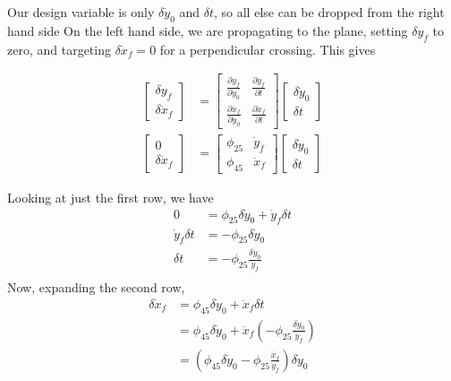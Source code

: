 \documentclass{article}
\begin{document}
Our design variable is only $\delta \dot{y}_0$ and $\delta t$, so all else can be dropped from the right hand side  On the left hand side, we are propagating to the plane, setting $\delta y_f$ to zero, and targeting $\delta \dot{x}_f=0$ for a perpendicular crossing. This gives 

\begin{align*}
    \begin{bmatrix}\delta y_f\\\delta \dot{x}_f\end{bmatrix}&=
    \begin{bmatrix}
    \frac{\partial y_f}{\partial \dot{y}_0}&\frac{\partial y_f}{\partial t}\\\frac{\partial \dot{x}_f}{\partial \dot{y}_0}&\frac{\partial \dot{x}_f}{\partial t}
    \end{bmatrix}
    \begin{bmatrix}\delta \dot{y}_0\\\delta t\end{bmatrix}\\
    \begin{bmatrix}0\\\delta \dot{x}_f\end{bmatrix}&=
    \begin{bmatrix}
    \phi_{25}&\dot{y}_f\\\phi_{45}&\ddot{x}_f
    \end{bmatrix}
    \begin{bmatrix}\delta \dot{y}_0\\\delta t\end{bmatrix}
\end{align*}

Looking at just the first row, we have
\begin{align*}
    0&=\phi_{25} \delta \dot{y}_0+\dot{y}_f\delta t\\
    \dot{y}_f\delta t&=-\phi_{25} \delta \dot{y}_0\\
    \delta t&=-\phi_{25} \frac{\delta\dot{y}_0}{\dot{y}_f}\\
\end{align*}
Now, expanding the second row,
\begin{align*}
    \delta \dot{x}_f &= \phi_{45}\delta\dot{y}_0+\ddot{x}_f\delta t\\
    &=\phi_{45}\delta\dot{y}_0+\ddot{x}_f\left(-\phi_{25} \frac{\delta\dot{y}_0}{\dot{y}_f}\right)\\
    &=\left(\phi_{45}\delta\dot{y}_0-\phi_{25} \frac{\ddot{x}_f}{\dot{y}_f}\right)\delta\dot{y}_0\\
\end{align*}
\end{document}

